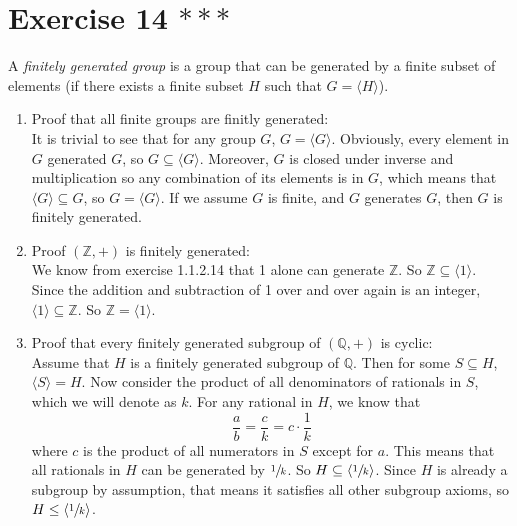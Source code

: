 \documentclass{article}
\newcommand{\Z}{\mathbb{Z}}
\newcommand{\Q}{\mathbb{Q}}
\newcommand{\sub}{\subseteq}
\begin{document}
    \section*{Exercise 14 $***$}
    A \textit{finitely generated group} is a group that can be generated
    by a finite subset of elements
    (if there exists a finite subset $H$ such that $G = \langle H \rangle$).
    \begin{enumerate}[label=\textbf{\alph*.}]
        \item 
            Proof that all finite groups are finitly generated: \\
            It is trivial to see that for any group $G$,
            $G = \langle G \rangle$.
            Obviously, every element in $G$ generated $G$,
            so $G \sub \langle G \rangle$.
            Moreover, $G$ is closed under inverse and multiplication
            so any combination of its elements is in $G$,
            which means that $\langle G \rangle \sub G$,
            so $G = \langle G \rangle$.
            If we assume $G$ is finite,
            and $G$ generates $G$,
            then $G$ is finitely generated.
        \item 
            Proof $(\Z, +)$ is finitely generated: \\
            We know from exercise 1.1.2.14 that 1 alone can generate $\Z$.
            So $\Z \sub \langle 1 \rangle$.
            Since the addition and subtraction of 1 over and over again
            is an integer,
            $\langle 1 \rangle \sub \Z$.
            So $\Z = \langle 1 \rangle$.
        \item
            Proof that every finitely generated subgroup of $(\Q, +)$
            is cyclic: \\
            Assume that $H$ is a finitely generated subgroup of $\Q$.
            Then for some $S \sub H$,
            $\langle S \rangle = H$.
            Now consider the product of all denominators of rationals in $S$,
            which we will denote as $k$.
            For any rational in $H$,
            we know that 
            \[ \dfrac{a}{b} = \dfrac{c}{k} = c \cdot \dfrac{1}{k} \]
            where $c$ is the product of all numerators in $S$
            except for $a$.
            This means that all rationals in $H$
            can be generated by $\sfrac{1}{k}$.
            So $H \sub \langle \sfrac{1}{k} \rangle$.
            Since $H$ is already a subgroup by assumption,
            that means it satisfies all other subgroup axioms,
            so $H \leq \langle \sfrac{1}{k} \rangle$.

\end{enumerate}
\end{document}
